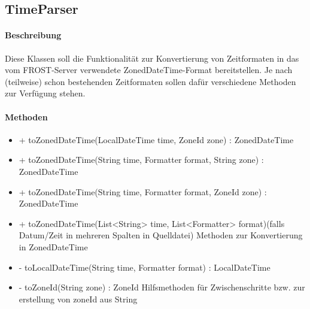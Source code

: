 \subsection{TimeParser}

\paragraph{Beschreibung}
Diese Klassen soll die Funktionalität zur Konvertierung von Zeitformaten in das vom FROST-Server verwendete ZonedDateTime-Format bereitstellen.
Je nach (teilweise) schon bestehenden Zeitformaten sollen dafür verschiedene Methoden zur Verfügung stehen.

\paragraph{Methoden}

\begin{itemize}
\item + toZonedDateTime(LocalDateTime time, ZoneId zone) : ZonedDateTime
\item + toZonedDateTime(String time, Formatter format, String zone) : ZonedDateTime
\item + toZonedDateTime(String time, Formatter format, ZoneId zone) : ZonedDateTime
\item + toZonedDateTime(List<String> time, List<Formatter> format)(falls Datum/Zeit in mehreren Spalten in Quelldatei)
Methoden zur Konvertierung in ZonedDateTime
\item - toLocalDateTime(String time, Formatter format) : LocalDateTime
\item - toZoneId(String zone) : ZoneId
Hilfsmethoden für Zwischenschritte bzw. zur erstellung von zoneId aus String
\end{itemize}